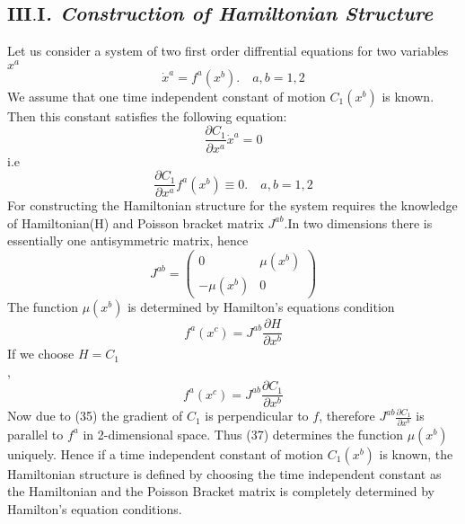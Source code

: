 \documentclass[14pt]{extarticle}
\begin{document}
\subsection*{\textit{$\mathbf{III.I}$. Construction of Hamiltonian Structure}}
Let us consider a system of two first order diffrential equations for two variables $x^{a}$ \\
\begin{equation}
\dot{x}^{a}=f^{a}\left(x^{b}\right) . \quad a, b=1,2
\end{equation}
We assume that one time independent constant of motion $C_{1}(x^{b})$ is known. Then this constant satisfies the following equation:\\
\begin{equation}
\frac{\partial C_{1}}{\partial x^{a}}\dot{x}^{a}=0
\end{equation}
i.e \\
\begin{equation}
\frac{\partial C_{1}}{\partial x^{a}} f^{a}\left(x^{b}\right) \equiv 0 . \quad a, b=1,2
\end{equation}
For constructing the Hamiltonian structure for the system requires the knowledge of Hamiltonian(H) and Poisson bracket matrix $J^{a b}$.In two dimensions there is essentially one antisymmetric matrix, hence\\
\begin{equation}
J^{a b}=\left( \begin{array}{cc}{0} & {\mu\left(x^{b}\right)} \\ {-\mu\left(x^{b}\right)} & {0}\end{array}\right)
\end{equation}
The function $\mu(x^{b})$ is determined by Hamilton's equations condition\\
\begin{equation*}
f^{a}\left(x^{c}\right)=J^{a b} \frac{\partial H}{\partial x^{b}}
\end{equation*}
If we choose $H=C_{1}$\\,
\begin{equation}
f^{a}\left(x^{c}\right)=J^{a b} \frac{\partial C_{1}}{\partial x^{b}}
\end{equation}
Now due to (35) the gradient of $C_{1}$ is perpendicular to $f$, therefore 
$J^{a b} \frac{\partial C_{1}}{\partial x^{b}}$ is parallel to $f^{a}$ in 2-dimensional space. Thus (37) determines the function $\mu(x^{b})$ uniquely. Hence if a time independent constant of motion $C_{1}(x^{b})$ is known, the Hamiltonian structure is defined by choosing the time independent constant as the Hamiltonian and the Poisson Bracket matrix is completely determined by Hamilton's equation conditions.\\
\end{document}
